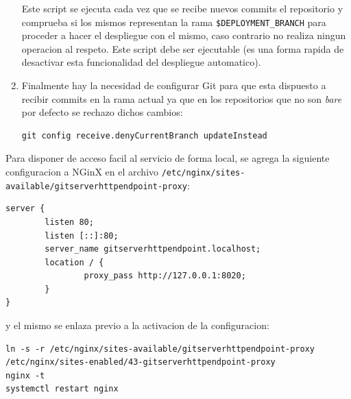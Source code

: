 \begin{enumerate}
\begin{lstlisting}[breaklines=true]
    \end{lstlisting}
    Este script se ejecuta cada vez que se recibe nuevos commits el repositorio y comprueba si los mismos representan la rama \texttt{\$DEPLOYMENT\_BRANCH} para proceder a hacer el despliegue con el mismo, caso contrario no realiza ningun operacion al respeto. Este script debe ser ejecutable (es una forma rapida de desactivar esta funcionalidad del despliegue automatico).
    \item Finalmente hay la necesidad de configurar Git para que esta dispuesto a recibir commits en la rama actual ya que en los repositorios que no son \textit{bare} por defecto se rechazo dichos cambios:
    \begin{lstlisting}
git config receive.denyCurrentBranch updateInstead
    \end{lstlisting}
\end{enumerate}

Para disponer de acceso facil al servicio de forma local, se agrega la siguiente configuracion a NGinX en el archivo \texttt{/etc/nginx/sites-available/gitserverhttpendpoint-proxy}:
\begin{lstlisting}
server {
        listen 80;
        listen [::]:80;
        server_name gitserverhttpendpoint.localhost;
        location / {
                proxy_pass http://127.0.0.1:8020;
        }
}
\end{lstlisting}
y el mismo se enlaza previo a la activacion de la configuracion:
\begin{lstlisting}[breaklines=true]
ln -s -r /etc/nginx/sites-available/gitserverhttpendpoint-proxy /etc/nginx/sites-enabled/43-gitserverhttpendpoint-proxy
nginx -t
systemctl restart nginx
\end{lstlisting}
